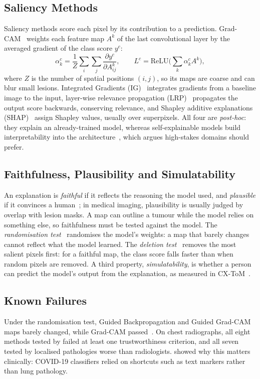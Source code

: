\documentclass[conference]{IEEEtran}
\renewcommand{\cite}{\citep}
\begin{document}
\subsection{Saliency Methods}
Saliency methods score each pixel by its contribution to a prediction. Grad-CAM~\cite{selvaraju2017gradcam} weights each feature map $A^k$ of the last convolutional layer by the averaged gradient of the class score $y^c$:
\begin{equation}
\alpha_k^c = \frac{1}{Z}\sum_i\sum_j \frac{\partial y^c}{\partial A^k_{ij}}, \qquad
L^c = \mathrm{ReLU}\Big(\sum_k \alpha_k^c A^k\Big),
\end{equation}
where $Z$ is the number of spatial positions $(i,j)$, so its maps are coarse and can blur small lesions. Integrated Gradients (IG)~\cite{sundararajan2017ig} integrates gradients from a baseline image to the input, layer-wise relevance propagation (LRP)~\cite{bach2015lrp} propagates the output score backwards, conserving relevance, and Shapley additive explanations (SHAP)~\cite{lundberg2017shap} assign Shapley values, usually over superpixels. All four are \emph{post-hoc}: they explain an already-trained model, whereas self-explainable models build interpretability into the architecture~\cite{hou2024sxai}, which \citet{rudin2019stop} argues high-stakes domains should prefer.
 
\subsection{Faithfulness, Plausibility and Simulatability}
\label{sec:properties}
An explanation is \emph{faithful} if it reflects the reasoning the model used, and \emph{plausible} if it convinces a human~\cite{jacovi2020faithfulness}; in medical imaging, plausibility is usually judged by overlap with lesion masks. A map can outline a tumour while the model relies on something else, so faithfulness must be tested against the model. The \emph{randomisation test}~\cite{adebayo2018sanity} randomises the model's weights: a map that barely changes cannot reflect what the model learned. The \emph{deletion test}~\cite{petsiuk2018rise} removes the most salient pixels first: for a faithful map, the class score falls faster than when random pixels are removed. A third property, \emph{simulatability}, is whether a person can predict the model's output from the explanation, as measured in CX-ToM~\cite{akula2022cxtom}.
 
\subsection{Known Failures}
Under the randomisation test, Guided Backpropagation and Guided Grad-CAM maps barely changed, while Grad-CAM passed~\cite{adebayo2018sanity}. On chest radiographs, all eight methods tested by \citet{arun2021trustworthiness} failed at least one trustworthiness criterion, and all seven tested by \citet{saporta2022benchmarking} localised pathologies worse than radiologists. \citet{degrave2021shortcuts} showed why this matters clinically: COVID-19 classifiers relied on shortcuts such as text markers rather than lung pathology.
\end{document}
